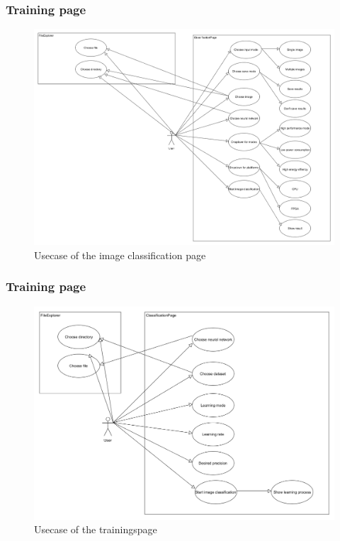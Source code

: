 \documentclass[parskip=full]{scrartcl}
\begin{document}
\subsubsection{Training page}
\begin{figure}[htb!]
\centering
\includegraphics[width=\textwidth]{ClassificationUsecase}
\caption{Usecase of the image classification page}
\end{figure}
\subsubsection{Training page}
\begin{figure}[htb!]
\centering
\includegraphics[width=\textwidth]{TrainUsecase}
\caption{Usecase of the trainingspage}
\end{figure}
\end{document}
